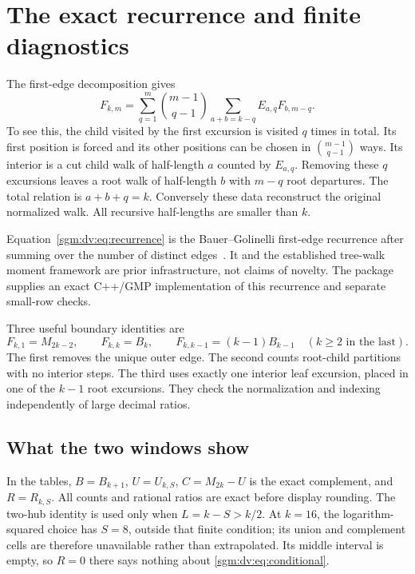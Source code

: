 \documentclass[11pt,letterpaper]{article}
\theoremstyle{remark}\newtheorem{remark}[theorem]{Remark}
\theoremstyle{definition}\newtheorem{definition}[theorem]{Definition}
\begin{document}
\section{The exact recurrence and finite diagnostics}\label{sgm:dv:sec:recurrence}
The first-edge decomposition gives
\begin{equation}\label{sgm:dv:eq:recurrence}
 F_{k,m}=\sum_{q=1}^{m}\binom{m-1}{q-1}
                 \sum_{a+b=k-q}E_{a,q}F_{b,m-q}.
\end{equation}
To see this, the child visited by the first excursion is visited $q$ times in total. Its first position is forced and its other positions can be chosen in $\binom{m-1}{q-1}$ ways. Its interior is a cut child walk of half-length $a$ counted by $E_{a,q}$. Removing these $q$ excursions leaves a root walk of half-length $b$ with $m-q$ root departures. The total relation is $a+b+q=k$. Conversely these data reconstruct the original normalized walk. All recursive half-lengths are smaller than $k$.

Equation~\eqref{sgm:dv:eq:recurrence} is the Bauer--Golinelli first-edge recurrence after summing over the number of distinct edges~\cite[Section 5]{bg}. It and the established tree-walk moment framework are prior infrastructure, not claims of novelty. The package supplies an exact C++/GMP implementation of this recurrence and separate small-row checks.

Three useful boundary identities are
\begin{equation}\label{sgm:dv:eq:boundaries}
 F_{k,1}=M_{2k-2},\qquad F_{k,k}=B_k,\qquad
 F_{k,k-1}=(k-1)B_{k-1}\quad(k\ge2\text{ in the last}).
\end{equation}
The first removes the unique outer edge. The second counts root-child partitions with no interior steps. The third uses exactly one interior leaf excursion, placed in one of the $k-1$ root excursions. They check the normalization and indexing independently of large decimal ratios.

\subsection{What the two windows show}
In the tables, $B=B_{k+1}$, $U=U_{k,S}$, $C=M_{2k}-U$ is the exact complement, and $R=R_{k,S}$. All counts and rational ratios are exact before display rounding. The two-hub identity is used only when $L=k-S>k/2$. At $k=16$, the logarithm-squared choice has $S=8$, outside that finite condition; its union and complement cells are therefore unavailable rather than extrapolated. Its middle interval is empty, so $R=0$ there says nothing about \eqref{sgm:dv:eq:conditional}.
\end{document}
